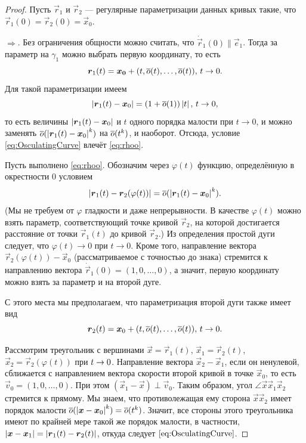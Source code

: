 \begin{proof}
	Пусть $\vec{r}_1$ и $\vec{r}_2$ --- регулярные параметризации данных кривых такие, что $\vec{r}_1(0) = \vec{r}_2(0) = \vec{x}_0$.

	$\Rightarrow$. Без ограничения общности можно считать, что $\dot{\vec{r}}_1(0) \parallel \vec{e}_1$. Тогда за параметр на $\gamma_1$ можно выбрать первую координату, то есть
	\[
		\boldsymbol{r}_1(t) = \boldsymbol{x_0} + (t, \overline{o}(t), \ldots, \overline{o}(t)),\,t \to 0.
	\]
	Для такой параметризации имеем
	\[
		\left\lvert\boldsymbol{r}_1(t) - \boldsymbol{x}_0\right\rvert = (1 + \overline{o}(1))\left\lvert t\right\rvert,\,t \to 0,
	\]
	то есть величины $\left\lvert\boldsymbol{r}_1(t) - \boldsymbol{x}_0\right\rvert$ и $t$ одного порядка малости при $t \to 0$, и можно заменять $\overline{o}(\left\lvert\boldsymbol{r}_1(t) - \boldsymbol{x}_0\right\rvert^k)$ на $\overline{o}(t^k)$, и наоборот. Отсюда, условие \eqref{eq:OsculatingCurve} влечёт \eqref{eq:rhoo}.

	Пусть выполнено \eqref{eq:rhoo}. Обозначим через $\varphi(t)$ функцию, определённую в окрестности $0$ условием
	\[
		\left\lvert\boldsymbol{r}_1(t) - \boldsymbol{r}_2(\varphi(t))\right\rvert = \overline{o}(\left\lvert\boldsymbol{r}_1(t) - \boldsymbol{x}_0\right\rvert^k).
	\]
	(Мы не требуем от $\varphi$ гладкости и даже непрерывности. В качестве $\varphi(t)$ можно взять параметр, соответствующий точке кривой $\vec{r}_2$, на которой достигается расстояние от точки $\vec{r}_1(t)$ до кривой $\vec{r}_2$.) Из определения простой дуги следует, что $\varphi(t) \to 0$ при $t \to 0$. Кроме того, направление вектора $\vec{r}_2(\varphi(t)) - \vec{x}_0$ (рассматриваемое с точностью до знака) стремится к направлению вектора $\dot{\vec{r}}_1(0) = (1, 0, \ldots, 0)$, а значит, первую координату можно взять за параметр и на второй дуге.

	С этого места мы предполагаем, что параметризация второй дуги также имеет вид
	\[
		\boldsymbol{r}_2(t) = \boldsymbol{x}_0 + (t, \overline{o}(t), \ldots, \overline{o}(t)),\,t \to 0.
	\]

	Рассмотрим треугольник с вершинами $\vec{x} = \vec{r}_1(t)$, $\vec{x}_1 = \vec{r}_2(t)$, $\vec{x}_2 = \vec{r}_2(\varphi(t))$ при $t \hm\to 0$. Направление вектора $\vec{x}_2 - \vec{x}_1$, если он
	ненулевой, сближается с направлением вектора скорости второй кривой в точке $\vec{x}_0$, то есть $\vec{v}_0 = (1, 0, \ldots, 0)$. При этом $(\vec{x}_1 - \vec{x}) \perp \vec{v}_0$. Таким образом, угол $\angle \vec{x}\vec{x}_1\vec{x}_2$ стремится к прямому. Мы знаем, что противолежащая ему сторона $\vec{x}\vec{x}_2$ имеет порядок малости $\overline{o}(\left\lvert\boldsymbol{x} - \boldsymbol{x}_0\right\rvert^k) = \overline{o}(t^k)$. Значит, все стороны этого треугольника имеют по крайней мере такой же порядок малости, в частности, $\left\lvert\boldsymbol{x} - \boldsymbol{x}_1\right\rvert = \left\lvert\boldsymbol{r}_1(t) - \boldsymbol{r}_2(t)\right\rvert$, откуда следует $\eqref{eq:OsculatingCurve}$.
\end{proof} %

